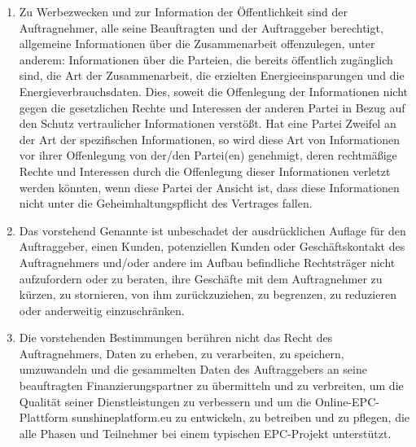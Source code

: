 \begin{multicols}{2}
\begin{enumerate}
   \item Zu Werbezwecken und zur Information der Öffentlichkeit sind der Auftragnehmer, alle seine Beauftragten und der Auftraggeber berechtigt, allgemeine Informationen über die Zusammenarbeit offenzulegen, unter anderem: Informationen über die Parteien, die bereits öffentlich zugänglich sind, die Art der Zusammenarbeit, die erzielten Energieeinsparungen und die Energieverbrauchsdaten. Dies, soweit die Offenlegung der Informationen nicht gegen die gesetzlichen Rechte und Interessen der anderen Partei in Bezug auf den Schutz vertraulicher Informationen verstößt. Hat eine Partei Zweifel an der Art der spezifischen Informationen, so wird diese Art von Informationen vor ihrer Offenlegung von der/den Partei(en) genehmigt, deren rechtmäßige Rechte und Interessen durch die Offenlegung dieser Informationen verletzt werden könnten, wenn diese Partei der Ansicht ist, dass diese Informationen nicht unter die Geheimhaltungspflicht des Vertrages fallen.
   \item Das vorstehend Genannte ist unbeschadet der ausdrücklichen Auflage für den Auftraggeber, einen Kunden, potenziellen Kunden oder Geschäftskontakt des Auftragnehmers und/oder andere im Aufbau befindliche Rechtsträger nicht aufzufordern oder zu beraten, ihre Geschäfte mit dem Auftragnehmer zu kürzen, zu stornieren, von ihm zurückzuziehen, zu begrenzen, zu reduzieren oder anderweitig einzuschränken.
   \item Die vorstehenden Bestimmungen berühren nicht das Recht des Auftragnehmers, Daten zu erheben, zu verarbeiten, zu speichern, umzuwandeln und die gesammelten Daten des Auftraggebers an seine beauftragten Finanzierungspartner zu übermitteln und zu verbreiten, um die Qualität seiner Dienstleistungen zu verbessern und um die Online-EPC-Plattform sunshineplatform.eu zu entwickeln, zu betreiben und zu pflegen, die alle Phasen und Teilnehmer bei einem typischen EPC-Projekt unterstützt.
   \end{enumerate}


\end{multicols}
